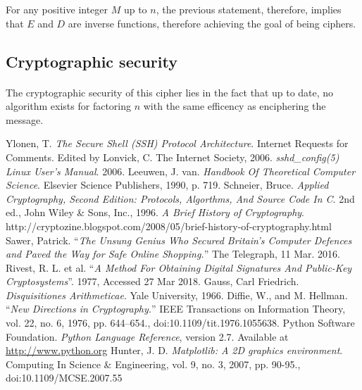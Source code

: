 \documentclass[a4paper, 12pt]{article}
\begin{document}
For any positive integer $M$ up to $n$, the previous statement, therefore, implies that $E$ and $D$ are inverse 
functions, therefore achieving the goal of being ciphers.

\subsection{Cryptographic security}
\paragraph*{}
The cryptographic security of this cipher lies in the fact that up to date, no algorithm exists for factoring $n$ with 
the same efficency as enciphering the message.

\pagebreak
\begin{thebibliography}{9}
Ylonen, T. \textit{The Secure Shell (SSH) Protocol Architecture}. Internet Requests for Comments. Edited by Lonvick, C.
The Internet Society, 2006.
\textit{sshd\_config(5) Linux User's Manual}. 2006.
Leeuwen, J. van. \textit{Handbook Of Theoretical Computer Science}. Elsevier Science Publishers, 1990, p. 719.
Schneier, Bruce. \textit{Applied Cryptography, Second Edition: Protocols, Algorthms, And Source Code In C}. 2nd ed., John Wiley \& Sons, Inc., 1996.
\textit{A Brief History of Cryptography}. http://cryptozine.blogspot.com/2008/05/brief-history-of-cryptography.html
Sawer, Patrick. ``\textit{The Unsung Genius Who Secured Britain's Computer Defences and Paved the Way for Safe Online Shopping.}'' The Telegraph, 11 Mar. 2016.
Rivest, R. L. et al. ``\textit{A Method For Obtaining Digital Signatures And Public-Key Cryptosystems}''. 1977, Accessed 27 Mar 2018.
Gauss, Carl Friedrich. \textit{Disquisitiones Arithmeticae}. Yale University, 1966.
Diffie, W., and M. Hellman. ``\textit{New Directions in Cryptography.}'' IEEE Transactions on Information Theory, vol. 22, no. 6, 1976, pp. 644–654., doi:10.1109/tit.1976.1055638.
Python Software Foundation. \textit{Python Language Reference}, version 2.7. Available at \url{http://www.python.org}
Hunter, J. D. \textit{Matplotlib: A 2D graphics environment}. Computing In Science \& Engineering, vol. 9, no. 3, 2007, pp. 90-95., doi:10.1109/MCSE.2007.55
\end{thebibliography}
\end{document}
